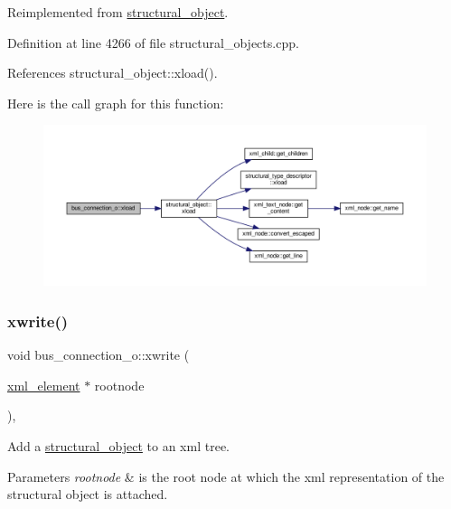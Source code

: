 Reimplemented from \hyperlink{classstructural__object_a9a964af7fe7e95b34d03bb514756bb33}{structural\+\_\+object}.



Definition at line 4266 of file structural\+\_\+objects.\+cpp.



References structural\+\_\+object\+::xload().

Here is the call graph for this function\+:
\nopagebreak
\begin{figure}[H]
\begin{center}
\leavevmode
\includegraphics[width=350pt]{d3/dfb/classbus__connection__o_a91d71ecab1533963248f3c50d86c9d0f_cgraph}
\end{center}
\end{figure}
\mbox{\label{classbus__connection__o_acb507e284b971944f09b6b26264dc0cf}} 
\subsubsection{\texorpdfstring{xwrite()}{xwrite()}}
{\footnotesize\ttfamily void bus\+\_\+connection\+\_\+o\+::xwrite (\begin{DoxyParamCaption}\item[{\hyperlink{classxml__element}{xml\+\_\+element} $\ast$}]{rootnode }\end{DoxyParamCaption})\hspace{0.3cm}{\ttfamily [override]}, {\ttfamily [virtual]}}



Add a \hyperlink{classstructural__object}{structural\+\_\+object} to an xml tree. 


\begin{DoxyParams}{Parameters}
{\em rootnode} & is the root node at which the xml representation of the structural object is attached. \\
\hline
\end{DoxyParams}



